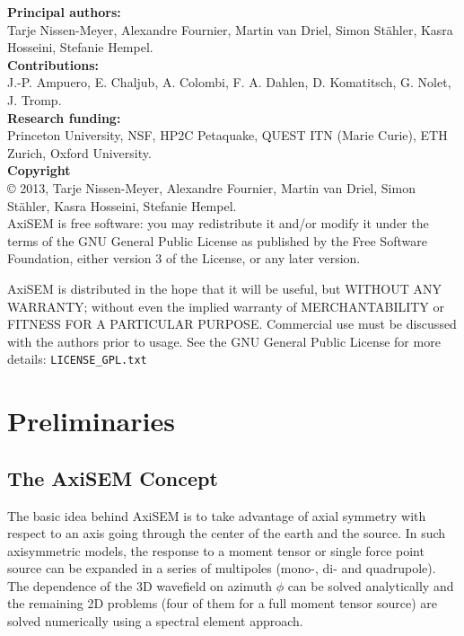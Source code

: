 \documentclass{article}
\begin{document}
%
\noindent \textbf{Principal authors:} \\
Tarje Nissen-Meyer, Alexandre
Fournier, Martin van Driel, Simon St\"{a}hler, Kasra Hosseini, Stefanie Hempel.\vspace*{0.3cm}\\
\noindent \textbf{Contributions:}\\
 J.-P. Ampuero, E. Chaljub, A. Colombi, F. A. Dahlen, D. Komatitsch,
 G. Nolet, J. Tromp.\vspace*{0.3cm}\\
\noindent \textbf{Research funding:} \\Princeton University, NSF, HP2C Petaquake,
QUEST ITN (Marie Curie), ETH Zurich, Oxford University.\vspace*{0.3cm}\\
%
\noindent \textbf{Copyright}\\
\copyright  \hspace*{0.1cm}
2013, Tarje Nissen-Meyer,
Alexandre Fournier, Martin van Driel, Simon St\"{a}hler, Kasra Hosseini, Stefanie Hempel.\vspace*{0.3cm}\\

AxiSEM is free software: you may redistribute it and/or modify it
under the terms of the GNU General Public License as published by the
Free Software Foundation, either version 3 of the License, or any
later version.

AxiSEM is distributed in the hope that it will be useful, but WITHOUT
ANY WARRANTY; without even the implied warranty of MERCHANTABILITY or
FITNESS FOR A PARTICULAR PURPOSE. Commercial use must be discussed
with the authors prior to usage. See the GNU General Public License
for more details: \verb|LICENSE_GPL.txt|
\newpage
\tableofcontents
%
\vspace*{1cm}

\section{Preliminaries}

\subsection{The AxiSEM Concept}

The basic idea behind AxiSEM is to take advantage of axial symmetry with respect
to an axis going through the center of the earth and the source. In such axisymmetric
models, the response to a moment tensor or single force point source can be expanded in a
series of multipoles (mono-, di- and quadrupole). The dependence of the 3D wavefield on
azimuth $\phi$ can be solved analytically and the remaining 2D problems (four of them for
a full moment tensor source) are solved numerically using a spectral
element approach.\\
\end{document}
